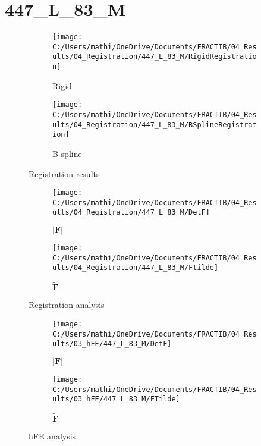 \documentclass{article}%
\begin{document}
%
\newpage%
\section*{447\_L\_83\_M}%
\label{sec:447L83M}%


\begin{figure}[h!]%
\begin{subfigure}[b]{0.5\linewidth}%
\texttt{[image: C:/Users/mathi/OneDrive/Documents/FRACTIB/04\_Results/04\_Registration/447\_L\_83\_M/RigidRegistration]}%
\caption{Rigid}%
\end{subfigure}%
\begin{subfigure}[b]{0.5\linewidth}%
\texttt{[image: C:/Users/mathi/OneDrive/Documents/FRACTIB/04\_Results/04\_Registration/447\_L\_83\_M/BSplineRegistration]}%
\caption{B{-}spline}%
\end{subfigure}%
\caption{Registration results}%
\end{figure}

%


\begin{figure}[h!]%
\begin{subfigure}[b]{0.5\linewidth}%
\texttt{[image: C:/Users/mathi/OneDrive/Documents/FRACTIB/04\_Results/04\_Registration/447\_L\_83\_M/DetF]}%
\caption{$|\mathbf{F}|$}%
\end{subfigure}%
\begin{subfigure}[b]{0.5\linewidth}%
\texttt{[image: C:/Users/mathi/OneDrive/Documents/FRACTIB/04\_Results/04\_Registration/447\_L\_83\_M/Ftilde]}%
\caption{$\tilde{\mathbf{F}}$}%
\end{subfigure}%
\caption{Registration analysis}%
\end{figure}

%


\begin{figure}[h!]%
\begin{subfigure}[b]{0.5\linewidth}%
\texttt{[image: C:/Users/mathi/OneDrive/Documents/FRACTIB/04\_Results/03\_hFE/447\_L\_83\_M/DetF]}%
\caption{$|\mathbf{F}|$}%
\end{subfigure}%
\begin{subfigure}[b]{0.5\linewidth}%
\texttt{[image: C:/Users/mathi/OneDrive/Documents/FRACTIB/04\_Results/03\_hFE/447\_L\_83\_M/FTilde]}%
\caption{$\tilde{\mathbf{F}}$}%
\end{subfigure}%
\caption{hFE analysis}%
\end{figure}
\end{document}
